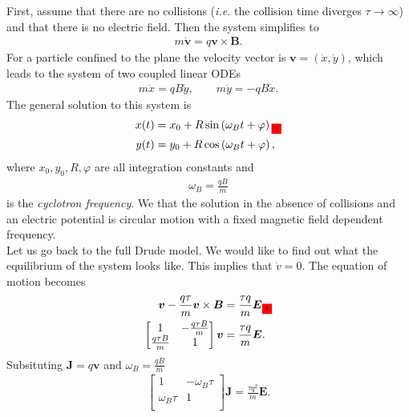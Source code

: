         \indent First, assume that there are no collisions (\textit{i.e.} the collision time diverges $\tau \rightarrow\infty$) and that there is no electric field. Then the system simplifies to
        \begin{align}
            m\dot{\bm{v}} =q \bm{v}\times \bm{B}.
        \end{align}
        For a particle confined to the plane the velocity vector is $\bm{v} = (\dot{x}, \dot{y})$, which leads to the system of two coupled linear ODEs
        \begin{align}
            m \ddot{x} = q B \dot{y}, \qquad m \ddot{y}= -q B \dot{x}.
        \end{align}
        The general solution to this system is
        \begin{align}
            x(t) &= x_0 + R \sin\left(\omega_Bt + \varphi \right)\colorbox{red}{,} \\
            y(t) &= y_0 + R \cos\left(\omega_Bt + \varphi \right),
        \end{align}
        where $x_0, y_0, R, \varphi$ are all integration constants and
        \begin{align}
            \omega_B = \frac{q B}{m}
        \end{align}
        is the \textit{cyclotron frequency}.
        We that the solution in the absence of collisions and an electric potential is circular motion with a fixed magnetic field dependent frequency.\\
        Let us go back to the full Drude model. We would like to find out what the equilibrium of the system looks like. This implies that $\dot{v} =0$. The equation of motion becomes 
        \begin{align}
            \bm{v} - \frac{q \tau}{m}\bm{v}\times\bm{B}  &=\frac{\tau q}{m} \bm{E} \colorbox{red}{,}\\
            \begin{bmatrix}
                1 & -\frac{q \tau B}{m} \\
                \frac{q \tau B}{m} & 1 \\
            \end{bmatrix} \bm{v} &= \frac{\tau q}{m} \bm{E}.
        \end{align}
        Subsituting $\bm{J} = q \bm{v}$ and $\omega_B = \frac{q B}{m}$
        \begin{align}
            \begin{bmatrix}
                1 & -\omega_B \tau \\
                \omega_B \tau & 1 \\
            \end{bmatrix}\bm{J} = \frac{\tau q^2}{m} \bm{E}.
        \end{align}
